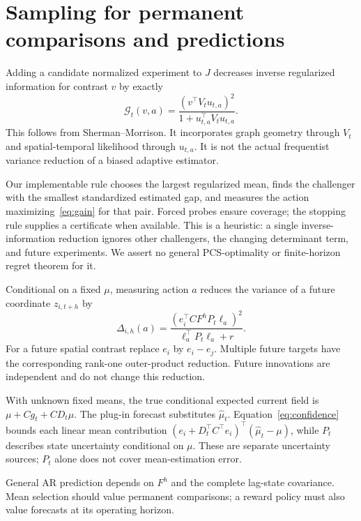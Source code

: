 \documentclass[11pt]{article}
\begin{document}
\section{Sampling for permanent comparisons and predictions}
Adding a candidate normalized experiment to $J$ decreases inverse regularized information for contrast $v$ by exactly
\begin{equation}
\boxed{\mathcal G_t(v,a)=
\frac{(v^\top V_tu_{t,a})^2}{1+u_{t,a}^\top V_tu_{t,a}}.}
\label{eq:gain}
\end{equation}
This follows from Sherman--Morrison. It incorporates graph geometry through $V_t$ and spatial-temporal likelihood through $u_{t,a}$. It is not the actual frequentist variance reduction of a biased adaptive estimator.

Our implementable rule chooses the largest regularized mean, finds the challenger with the smallest standardized estimated gap, and measures the action maximizing~\eqref{eq:gain} for that pair. Forced probes ensure coverage; the stopping rule supplies a certificate when available. This is a heuristic: a single inverse-information reduction ignores other challengers, the changing determinant term, and future experiments. We assert no general PCS-optimality or finite-horizon regret theorem for it.

Conditional on a fixed $\mu$, measuring action $a$ reduces the variance of a future coordinate $z_{i,t+h}$ by
\begin{equation}
\boxed{\Delta_{i,h}(a)=
\frac{(e_i^\top CF^hP_t\ell_a)^2}{\ell_a^\top P_t\ell_a+r}.}
\label{eq:prediction-gain}
\end{equation}
For a future spatial contrast replace $e_i$ by $e_i-e_j$. Multiple future targets have the corresponding rank-one outer-product reduction. Future innovations are independent and do not change this reduction.

With unknown fixed means, the true conditional expected current field is $\mu+Cg_t+CD_t\mu$. The plug-in forecast substitutes $\widehat\mu_t$. Equation~\eqref{eq:confidence} bounds each linear mean contribution $(e_i+D_t^\top C^\top e_i)^\top(\widehat\mu_t-\mu)$, while $P_t$ describes state uncertainty conditional on $\mu$. These are separate uncertainty sources; $P_t$ alone does not cover mean-estimation error.

General AR prediction depends on $F^h$ and the complete lag-state covariance. Mean selection should value permanent comparisons; a reward policy must also value forecasts at its operating horizon.
\end{document}
